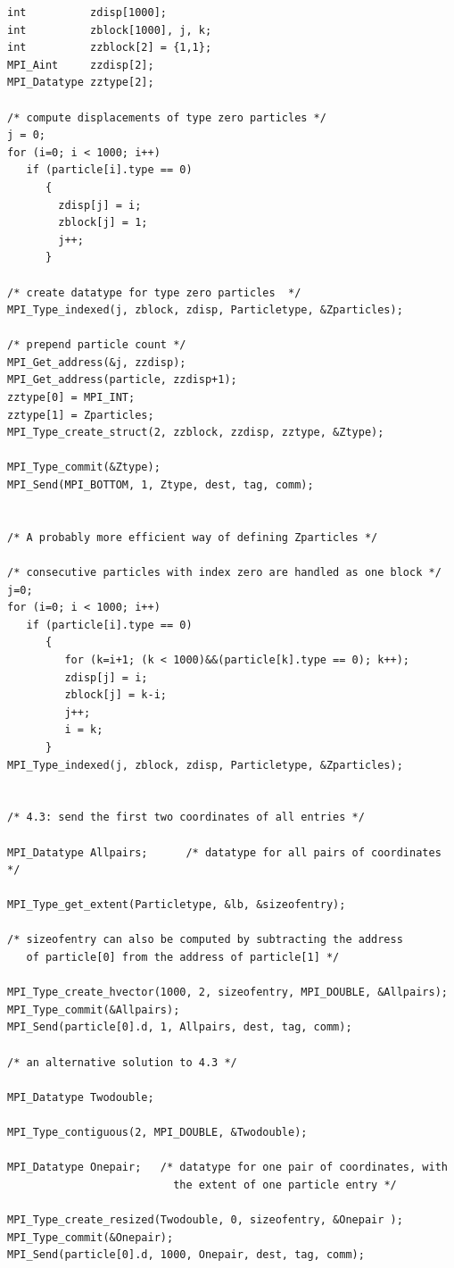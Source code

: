 \begin{example}
\begin{lstlisting}[language={[MPI]C}]
int          zdisp[1000];
int          zblock[1000], j, k;
int          zzblock[2] = {1,1};
MPI_Aint     zzdisp[2];
MPI_Datatype zztype[2];

/* compute displacements of type zero particles */
j = 0;
for (i=0; i < 1000; i++)
   if (particle[i].type == 0)
      {
        zdisp[j] = i;
        zblock[j] = 1;
        j++;
      }

/* create datatype for type zero particles  */
MPI_Type_indexed(j, zblock, zdisp, Particletype, &Zparticles);

/* prepend particle count */
MPI_Get_address(&j, zzdisp);
MPI_Get_address(particle, zzdisp+1);
zztype[0] = MPI_INT;
zztype[1] = Zparticles;
MPI_Type_create_struct(2, zzblock, zzdisp, zztype, &Ztype);

MPI_Type_commit(&Ztype);
MPI_Send(MPI_BOTTOM, 1, Ztype, dest, tag, comm);


/* A probably more efficient way of defining Zparticles */

/* consecutive particles with index zero are handled as one block */
j=0;
for (i=0; i < 1000; i++)
   if (particle[i].type == 0)
      {
         for (k=i+1; (k < 1000)&&(particle[k].type == 0); k++);
         zdisp[j] = i;
         zblock[j] = k-i;
         j++;
         i = k;
      }
MPI_Type_indexed(j, zblock, zdisp, Particletype, &Zparticles);


/* 4.3: send the first two coordinates of all entries */

MPI_Datatype Allpairs;      /* datatype for all pairs of coordinates */

MPI_Type_get_extent(Particletype, &lb, &sizeofentry);

/* sizeofentry can also be computed by subtracting the address
   of particle[0] from the address of particle[1] */

MPI_Type_create_hvector(1000, 2, sizeofentry, MPI_DOUBLE, &Allpairs);
MPI_Type_commit(&Allpairs);
MPI_Send(particle[0].d, 1, Allpairs, dest, tag, comm);

/* an alternative solution to 4.3 */

MPI_Datatype Twodouble;

MPI_Type_contiguous(2, MPI_DOUBLE, &Twodouble);

MPI_Datatype Onepair;   /* datatype for one pair of coordinates, with
                          the extent of one particle entry */

MPI_Type_create_resized(Twodouble, 0, sizeofentry, &Onepair );
MPI_Type_commit(&Onepair);
MPI_Send(particle[0].d, 1000, Onepair, dest, tag, comm);
\end{lstlisting}
\end{example}

